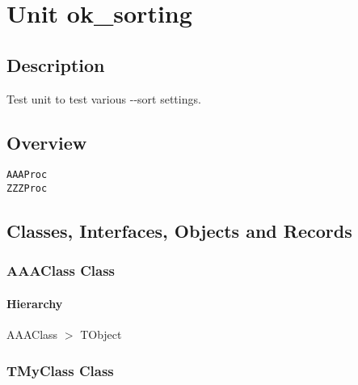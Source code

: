 \documentclass{report}
\begin{document}
\newlength{\tmplength}
\chapter{Unit ok{\_}sorting}
\section{Description}
Test unit to test various {-}{-}sort settings.
\section{Overview}
\begin{description}
\item[\texttt{\begin{ttfamily}AAAClass\end{ttfamily} Class}]
\item[\texttt{\begin{ttfamily}TMyClass\end{ttfamily} Class}]
\item[\texttt{\begin{ttfamily}TMyRecord\end{ttfamily} Record}]
\item[\texttt{\begin{ttfamily}ZZZClass\end{ttfamily} Class}]
\end{description}
\begin{description}
\item[\texttt{AAAProc}]
\item[\texttt{ZZZProc}]
\end{description}
\section{Classes, Interfaces, Objects and Records}
\subsection*{AAAClass Class}
\subsubsection*{\large{\textbf{Hierarchy}}\normalsize\hspace{1ex}\hfill}
AAAClass {$>$} TObject
\subsection*{TMyClass Class}
\end{document}
